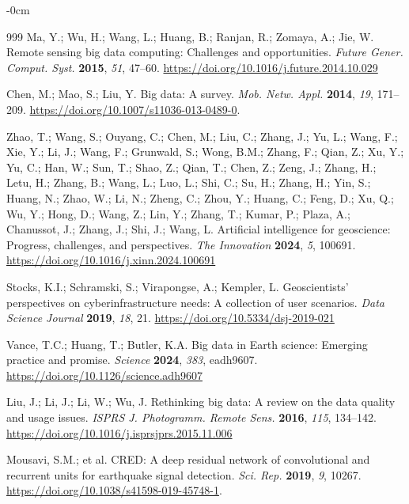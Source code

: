 \documentclass[data,article,accept,pdftex,moreauthors]{Definitions/mdpi}
\begin{document}
\begin{adjustwidth}{-\extralength}{0cm}
\begin{thebibliography}{999}
Ma, Y.; Wu, H.; Wang, L.; Huang, B.; Ranjan, R.; Zomaya, A.; Jie, W. Remote sensing big data computing: Challenges and opportunities. \emph{Future Gener. Comput. Syst.} \textbf{2015}, \emph{51}, 47--60. \url{https://doi.org/10.1016/j.future.2014.10.029}

Chen, M.; Mao, S.; Liu, Y. Big data: A survey. \emph{Mob. Netw. Appl.} \textbf{2014}, \emph{19}, 171--209. \url{https://doi.org/10.1007/s11036-013-0489-0}.

Zhao, T.; Wang, S.; Ouyang, C.; Chen, M.; Liu, C.; Zhang, J.; Yu, L.; Wang, F.; Xie, Y.; Li, J.; Wang, F.; Grunwald, S.; Wong, B.M.; Zhang, F.; Qian, Z.; Xu, Y.; Yu, C.; Han, W.; Sun, T.; Shao, Z.; Qian, T.; Chen, Z.; Zeng, J.; Zhang, H.; Letu, H.; Zhang, B.; Wang, L.; Luo, L.; Shi, C.; Su, H.; Zhang, H.; Yin, S.; Huang, N.; Zhao, W.; Li, N.; Zheng, C.; Zhou, Y.; Huang, C.; Feng, D.; Xu, Q.; Wu, Y.; Hong, D.; Wang, Z.; Lin, Y.; Zhang, T.; Kumar, P.; Plaza, A.; Chanussot, J.; Zhang, J.; Shi, J.; Wang, L. Artificial intelligence for geoscience: Progress, challenges, and perspectives. \emph{The Innovation} \textbf{2024}, \emph{5}, 100691. \url{https://doi.org/10.1016/j.xinn.2024.100691}%

Stocks, K.I.; Schramski, S.; Virapongse, A.; Kempler, L. Geoscientists' perspectives on cyberinfrastructure needs: A collection of user scenarios. \emph{Data Science Journal} \textbf{2019}, \emph{18}, 21. \url{https://doi.org/10.5334/dsj-2019-021}

Vance, T.C.; Huang, T.; Butler, K.A. Big data in Earth science: Emerging practice and promise. \emph{Science} \textbf{2024}, \emph{383}, eadh9607. \url{https://doi.org/10.1126/science.adh9607}%

Liu, J.; Li, J.; Li, W.; Wu, J. Rethinking big data: A review on the data quality and usage issues. \emph{ISPRS J. Photogramm. Remote Sens.} \textbf{2016}, \emph{115}, 134--142. \url{https://doi.org/10.1016/j.isprsjprs.2015.11.006}

Mousavi, S.M.; et al. CRED: A deep residual network of convolutional and recurrent units for earthquake signal detection. \emph{Sci. Rep.} \textbf{2019}, \emph{9}, 10267. \url{https://doi.org/10.1038/s41598-019-45748-1}. %


\end{thebibliography}
\end{adjustwidth}
\end{document}
